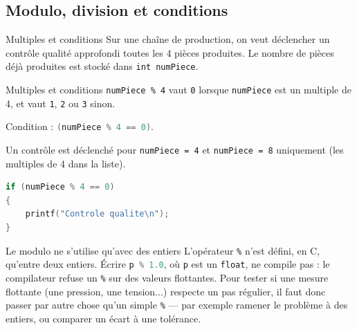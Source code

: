 \subsection{Modulo, division et conditions}

\begin{UPSTIexercice}{Multiples et conditions}
    Sur une chaîne de production, on veut déclencher un contrôle qualité approfondi toutes les 4 pièces produites. Le nombre de pièces déjà produites est stocké dans \texttt{int numPiece}.
\end{UPSTIexercice}

\begin{UPSTIprofOnlyEnv}
    \begin{UPSTIcorrectionP}{Multiples et conditions}
        \texttt{numPiece \% 4} vaut \texttt{0} lorsque \texttt{numPiece} est un multiple de 4, et vaut \texttt{1}, \texttt{2} ou \texttt{3} sinon.

        Condition : \lstinline[language=C]{(numPiece % 4 == 0)}.

        Un contrôle est déclenché pour \texttt{numPiece = 4} et \texttt{numPiece = 8} uniquement (les multiples de 4 dans la liste).

        \begin{lstlisting}[language=C]
if (numPiece % 4 == 0)
{
    printf("Controle qualite\n");
}
        \end{lstlisting}
    \end{UPSTIcorrectionP}
\end{UPSTIprofOnlyEnv}

\begin{UPSTIwarning}{Le modulo ne s'utilise qu'avec des entiers}
    L'opérateur \texttt{\%} n'est défini, en C, qu'entre deux entiers. Écrire \lstinline[language=C]{p % 1.0}, où \texttt{p} est un \texttt{float}, ne compile pas : le compilateur refuse un \texttt{\%} sur des valeurs flottantes. Pour tester si une mesure flottante (une pression, une tension...) respecte un pas régulier, il faut donc passer par autre chose qu'un simple \texttt{\%} --- par exemple ramener le problème à des entiers, ou comparer un écart à une tolérance.
\end{UPSTIwarning}


